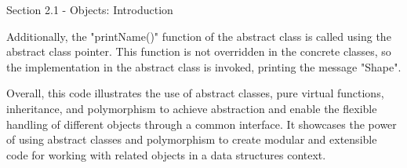 \begin{notes}{Section 2.1 - Objects: Introduction}
\begin{highlight}
        Additionally, the "printName()" function of the abstract class is called using the abstract class pointer. This function is not overridden in the concrete classes, so the implementation in the abstract class is invoked, printing the message 
        "Shape".
    
        Overall, this code illustrates the use of abstract classes, pure virtual functions, inheritance, and polymorphism to achieve abstraction and enable the flexible handling of different objects through a common interface. It showcases the power 
        of using abstract classes and polymorphism to create modular and extensible code for working with related objects in a data structures context.
    \end{highlight}
\end{notes}

